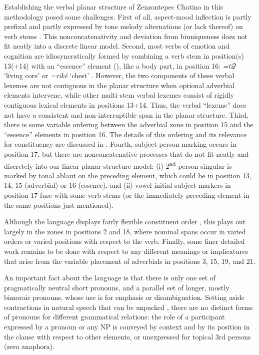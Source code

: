 \documentclass[output=paper]{langscibook}
\begin{document}
\hspace*{-2.5pt}Establishing the verbal planar structure of Zenzontepec Chatino in this methodology posed some challenges. First of all, aspect-mood inflection is partly prefixal and partly expressed by tone melody alternations (or lack thereof) on verb stems \citep{Campbell2019}. This nonconcatenativity and deviation from biuniqueness does not fit neatly into a discrete linear model. Second, most verbs of emotion and cognition are idiosyncratically formed by combining a verb stem in position(s) 13(+14) with an “essence” element (\citealt{CruzStump2018}), like a body part, in position 16: \textit{=tīʔ} `living core' or \textit{=rīké} `chest' \citep{Campbell2015}. However, the two components of these verbal lexemes are not contiguous in the planar structure when optional adverbial elements intervene, while other multi-stem verbal lexemes consist of rigidly contiguous lexical elements in positions 13+14. Thus, the verbal “lexeme” does not have a consistent and non-interruptible span in the planar structure. Third, there is some variable ordering between the adverbial zone in position 15 and the “essence” elements in position 16. The details of this ordering and its relevance for constituency are discussed in . Fourth, subject person marking occurs in position 17, but there are nonconcatenative processes that do not fit neatly and discretely into our linear planar structure model: (i) 2\textsuperscript{nd}{}-person singular is marked by tonal ablaut on the preceding element, which could be in position 13, 14, 15 (adverbial) or 16 (essence), and (ii) vowel-initial subject markers in position 17 fuse with some verb stems (or the immediately preceding element in the same positions just mentioned).

Although the language displays fairly flexible constituent order \citep{Campbell2021a}, this plays out largely in the zones in positions 2 and 18, where nominal spans occur in varied orders or varied positions with respect to the verb. Finally, some finer detailed work remains to be done with respect to any different meanings or implicatures that arise from the variable placement of adverbials in positions 3, 15, 19, and 21.

An important fact about the language is that there is only one set of pragmatically neutral short pronouns, and a parallel set of longer, mostly bimoraic pronouns, whose use is for emphasis or disambiguation. Setting aside contractions in natural speech that can be unpacked \citep{Campbell2014}, there are no distinct forms of pronouns for different grammatical relations: the role of a participant expressed by a pronoun or any NP is conveyed by context and by its position in the clause with respect to other elements, or unexpressed for topical 3rd persons (zero anaphora).
\end{document}
